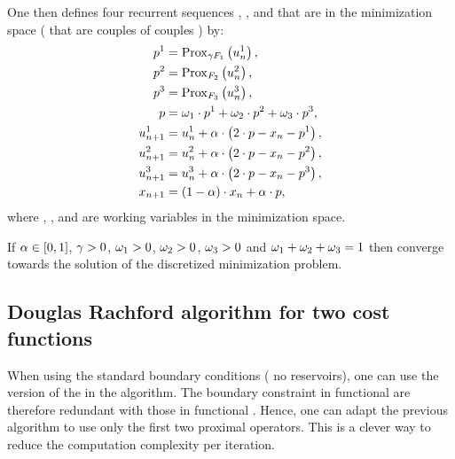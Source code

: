         One then defines four recurrent sequences , ,  and  that
        are in the minimization space (\ie{} that are couples of couples \coupleFM{}) by:
        \begin{align}
            p^1 &= \mathrm{Prox}_{\gamma F_1}\left(u^1_{n}\right),\\
            p^2 &= \mathrm{Prox}_{F_2}\left(u^2_{n}\right),\\
            p^3 &= \mathrm{Prox}_{F_3}\left(u^3_{n}\right),\\
            p &= \omega_1 \cdot p^1 + \omega_2 \cdot p^2 + \omega_3 \cdot p^3,\\
            u^1_{n+1} &= u^1_{n} + \alpha \cdot \left( 2 \cdot p - x_{n} - p^1 \right),\\
            u^2_{n+1} &= u^2_{n} + \alpha \cdot \left( 2 \cdot p - x_{n} - p^2 \right),\\
            u^3_{n+1} &= u^3_{n} + \alpha \cdot \left( 2 \cdot p - x_{n} - p^3 \right),\\
            x_{n+1} &= \left( 1 - \alpha \right) \cdot x_{n} + \alpha \cdot p,
        \end{align}
        where \drTStateP{}, \drTStatePI{}, \drTStatePII{} and \drTStatePIII{} are working variables in the minimization space.

        If $\alpha\in [0,1]$, $\gamma>0$, $\omega_1>0$, $\omega_2>0$, $\omega_3>0$ and 
        $\omega_1+\omega_2+\omega_3=1$ then  converge towards the solution of the discretized
        minimization problem.

    \subsection{Douglas Rachford algorithm for two cost functions}
    \noindent

        When using the standard boundary conditions (\ie{} no reservoirs), one can use the  version of the 
        in the \drAlgo{} algorithm.
        The boundary constraint in functional \costIIIToMin{} are therefore redundant with those in functional
        \costIToMin{}. Hence, one can adapt the previous algorithm to use only the first two proximal operators. This is a clever
        way to reduce the computation complexity per iteration.

